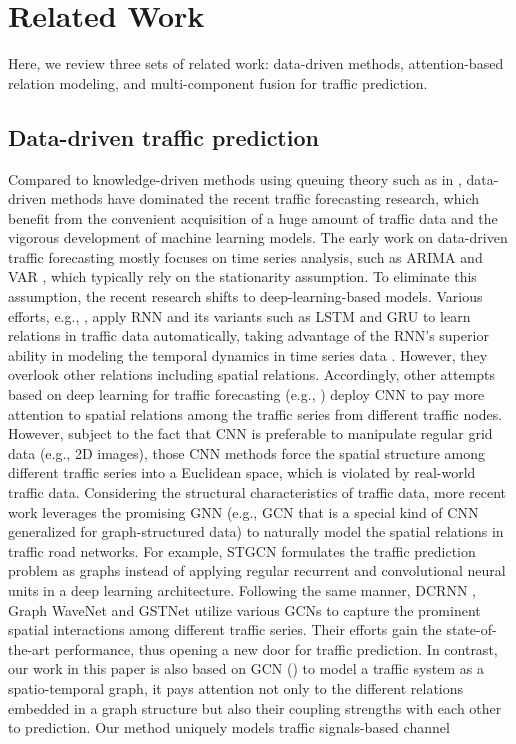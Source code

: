 \section{Related Work}
\label{sec:related_work}
Here, we review three sets of related work: data-driven methods, attention-based relation modeling, and multi-component fusion for traffic prediction.

\subsection{Data-driven traffic prediction}
Compared to knowledge-driven methods using queuing theory such as in \cite{cascetta2013transportation}, data-driven methods have dominated the recent traffic forecasting research, which benefit from the convenient acquisition of a huge amount of traffic data and the vigorous development of machine learning models. The early work on data-driven traffic forecasting mostly focuses on time series analysis, such as ARIMA \cite{williams2003modeling} and VAR \cite{zivot2006vector}, which typically rely on the stationarity assumption. To eliminate this assumption, the recent research shifts to deep-learning-based models. Various efforts, e.g., \cite{zhao2017lstm,ma2015long,bai2020adaptive,pan2020spatio}, apply RNN and its variants such as LSTM \cite{hochreiter1997long} and GRU \cite{cho2014learning} to learn relations in traffic data automatically, taking advantage of the RNN’s superior ability in modeling the temporal dynamics in time series data \cite{connor1994recurrent}. However, they overlook other relations including spatial relations. Accordingly, other attempts based on deep learning for traffic forecasting (e.g., \cite{wu2016short,ma2017learning,zhang2017deep}) deploy CNN to pay more attention to spatial relations among the traffic series from different traffic nodes. However, subject to the fact that CNN is preferable to manipulate regular grid data (e.g., 2D images), those CNN methods force the spatial structure among different traffic series into a Euclidean space, which is violated by real-world traffic data. Considering the structural characteristics of traffic data, more recent work leverages the promising GNN (e.g., GCN \cite{kipf2016semi} that is a special kind of CNN generalized for graph-structured data) to naturally model the spatial relations in traffic road networks. For example, STGCN \cite{yu2017spatio} formulates the traffic prediction problem as graphs instead of applying regular recurrent and convolutional neural units in a deep learning architecture. Following the same manner, DCRNN \cite{li2017diffusion}, Graph WaveNet \cite{wu2019graph} and GSTNet \cite{fang2019gstnet} utilize various GCNs to capture the prominent spatial interactions among different traffic series. Their efforts gain the state-of-the-art performance, thus opening a new door for traffic prediction. In contrast, our work in this paper is also based on GCN (\cite{mengzhang2020spatial, song2020spatial}) to model a traffic system as a spatio-temporal graph, it pays attention not only to the different relations embedded in a graph structure but also their coupling strengths with each other to prediction. Our method uniquely models traffic signals-based channel 